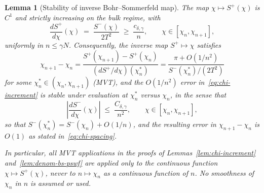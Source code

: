 \documentclass[12pt,a4paper]{amsart}
\newtheorem{lemma}[theorem]{Lemma}
\begin{document}
\begin{lemma}[Stability of inverse Bohr--Sommerfeld map]
\label{lem:bs-inverse-stability}
The map $\chi \mapsto S^+(\chi)$ is $C^1$ and strictly
increasing on the bulk regime, with
\begin{equation}\label{eq:dSplus-lower}
  \frac{dS^+}{d\chi}(\chi) \;=\; \frac{S^-(\chi)}{2T^2}
  \;\ge\; \frac{c_{\delta,\gamma}}{n},
  \qquad \chi \in [\chi_n, \chi_{n+1}],
\end{equation}
uniformly in $n \le \gamma N$.
Consequently, the inverse map $S^+ \mapsto \chi$ satisfies
\begin{equation}\label{eq:chi-from-Splus}
  \chi_{n+1} - \chi_n
  = \frac{S^+(\chi_{n+1}) - S^+(\chi_n)}{(dS^+/d\chi)(\chi_n^*)}
  = \frac{\pi + O(1/n^2)}{S^-(\chi_n^*)/(2T^2)}
\end{equation}
for some $\chi_n^* \in (\chi_n, \chi_{n+1})$ (MVT),
and the $O(1/n^2)$ error in~\eqref{eq:chi-increment} is stable
under evaluation at $\chi_n^*$ versus $\chi_n$, in the sense that
\begin{equation}\label{eq:Sminus-stability}
  \left|\frac{dS^-}{d\chi}(\chi)\right|
  \;\le\; \frac{C_{\delta,\gamma}}{n^2},
  \qquad \chi \in [\chi_n, \chi_{n+1}],
\end{equation}
so that $S^-(\chi_n^*) = S^-(\chi_n) + O(1/n)$,
and the resulting error in $\chi_{n+1} - \chi_n$
is $O(1)$ as stated in~\eqref{eq:chi-spacing}.

In particular, all MVT applications in the proofs of
Lemmas~\ref{lem:chi-increment} and~\ref{lem:denom-bs-pswf}
are applied only to the \emph{continuous} function
$\chi \mapsto S^+(\chi)$, never to $n \mapsto \chi_n$
as a continuous function of $n$.
No smoothness of $\chi_n$ in $n$ is assumed or used.
\end{lemma}
\end{document}
